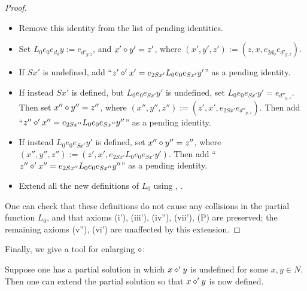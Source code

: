 \begin{proof}
\begin{itemize}
\item Remove this identity from the list of pending identities.
\item Set $L_0 e_0 e_{d_0} y := e_{d'_{y,z}}$, and $x' \diamond y' = z'$, where $(x',y',z') := (z, x, e_{2d_0} e_{d'_{y,z}})$.
\item If $Sx'$ is undefined, add ``$z' \diamond' x' = e_{2Sx'} L_0 e_0 e_{Sx'} y'$'' as a pending identity.
\item If instead $Sx'$ is defined, but $L_0 e_0 e_{Sx'} y'$ is undefined, set $L_0 e_0 e_{Sx'} y' = e_{d''_{y,z}}$.  Then set $x'' \diamond y'' = z''$, where $(x'',y'',z'') := (z', x', e_{2Sx'} e_{d''_{y,z}})$.  Then add ``$z'' \diamond' x'' = e_{2Sx''} L_0 e_0 e_{Sx''} y''$'' as a pending identity.
\item If instead $L_0 e_0 e_{Sx'} y'$ is defined, set $x'' \diamond y'' = z''$, where $(x'',y'',z'') := (z', x', e_{2Sx'} L_0 e_0 e_{Sx'} y')$.  Then add ``$z'' \diamond' x'' = e_{2Sx''} L_0 e_0 e_{Sx''} y''$'' as a pending identity.
\item Extend all the new definitions of $L_0$ using , .
\end{itemize}
One can check that these definitions do not cause any collisions in the partial function $L_0$, and that axioms (i'), (iii'), (iv''), (vii'), (P) are preserved; the remaining axioms (v''), (vi') are unaffected by this extension.
\end{proof}

Finally, we give a tool for enlarging $\op$:

\begin{proposition}[Enlarging $\op$]\label{enlarge-op}  Suppose one has a partial solution in which $x \diamond' y$ is undefined for some $x,y \in N$.  Then one can extend the partial solution so that $x \diamond' y$ is now defined.
\end{proposition}

